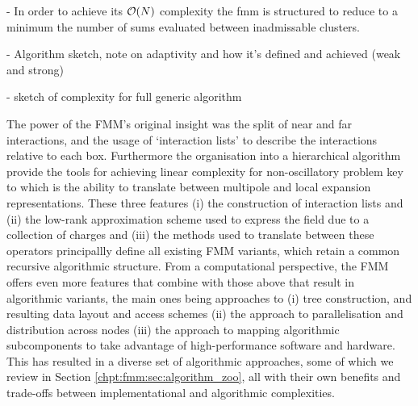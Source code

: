 - In order to achieve its $\mathcal{O}(N)$ complexity the \acrshort{fmm} is structured to reduce to a minimum the number of sums evaluated between inadmissable clusters.

- Algorithm sketch, note on adaptivity and how it's defined and achieved (weak and strong)

- sketch of complexity for full generic algorithm

The power of the FMM's original insight was the split of near and far interactions, and the usage of `interaction lists' to describe the interactions relative to each box. Furthermore the organisation into a hierarchical algorithm provide the tools for achieving linear complexity for non-oscillatory problem key to which is the ability to translate between multipole and local expansion representations. These three features (i) the construction of interaction lists and (ii) the low-rank approximation scheme used to express the field due to a collection of charges and (iii) the methods used to translate between these operators principallly define all existing FMM variants, which retain a common recursive algorithmic structure. From a computational perspective, the FMM offers even more features that combine with those above that result in algorithmic variants, the main ones being approaches to (i) tree construction, and resulting data layout and access schemes (ii) the approach to parallelisation and distribution across nodes (iii) the approach to mapping algorithmic subcomponents to take advantage of high-performance software and hardware.  This has resulted in a diverse set of algorithmic approaches, some of which we review in Section \ref{chpt:fmm:sec:algorithm_zoo}, all with their own benefits and trade-offs between implementational and algorithmic complexities.






